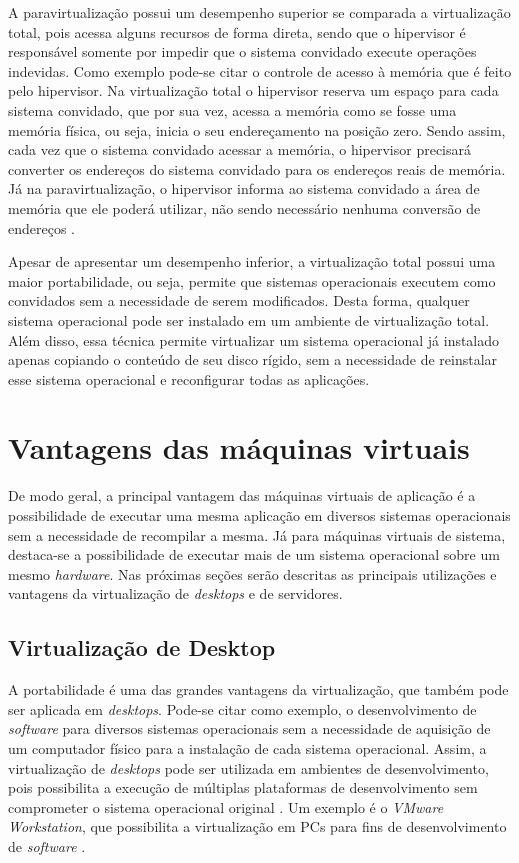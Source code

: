 A paravirtualização possui um desempenho superior se comparada a virtualização total, pois acessa alguns recursos de forma direta, sendo que 
o hipervisor é responsável somente por impedir que o sistema convidado execute operações indevidas. Como exemplo pode-se citar o controle de
acesso à memória que é feito pelo hipervisor. Na virtualização total o hipervisor reserva um espaço para cada sistema convidado, que por sua vez, 
acessa a memória como se fosse uma memória física, ou seja, inicia o seu endereçamento na posição zero. Sendo assim, cada vez que o sistema 
convidado acessar a memória, o hipervisor precisará converter os endereços do sistema convidado para os endereços reais de memória. Já na 
paravirtualização, o hipervisor informa ao sistema convidado a área de memória que ele poderá utilizar, não sendo necessário nenhuma 
conversão de endereços \cite{maziero2013}.

Apesar de apresentar um desempenho inferior, a virtualização total possui uma maior portabilidade, ou seja, permite que sistemas operacionais 
executem como convidados sem a necessidade de serem modificados. Desta forma, qualquer sistema operacional pode ser instalado em um ambiente 
de virtualização total. Além disso, essa técnica permite virtualizar um sistema operacional já instalado apenas copiando o conteúdo de seu disco 
rígido, sem a necessidade de reinstalar esse sistema operacional e reconfigurar todas as aplicações.

\section{Vantagens das máquinas virtuais}
\label{section:virtvantag}

De modo geral, a principal vantagem das máquinas virtuais de aplicação é a possibilidade de executar uma mesma aplicação em diversos sistemas 
operacionais sem a necessidade de recompilar a mesma. Já para máquinas virtuais de sistema, destaca-se a possibilidade de executar mais de um 
sistema operacional sobre um mesmo \textit{hardware}. Nas próximas seções serão descritas as principais utilizações e vantagens da virtualização 
de \textit{desktops} e de servidores.

\subsection{Virtualização de Desktop}
\label{section:virtdesk}

A portabilidade é uma das grandes vantagens da virtualização, que também pode ser aplicada em \textit{desktops}. Pode-se citar como exemplo, 
o desenvolvimento de \textit{software} para diversos sistemas operacionais sem a necessidade de aquisição de um computador físico para a instalação
de cada sistema operacional. Assim, a virtualização de \textit{desktops} pode ser utilizada em ambientes de desenvolvimento, pois possibilita 
a execução de múltiplas plataformas de desenvolvimento sem comprometer o sistema operacional original \cite{carissimi2008}. Um exemplo é o 
\textit{VMware Workstation}, que possibilita a virtualização em \acp{PC} para fins de desenvolvimento de \textit{software} \cite{vmware2016}.

